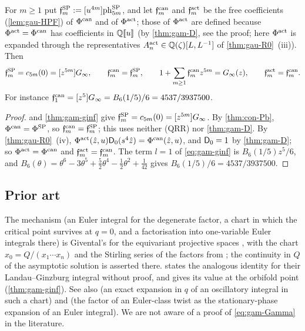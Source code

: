 \begin{cor}
\label{cor:gam-free}
For $m\geq 1$ put $\mathfrak{f}^{\mathrm{SP}}_m:=[u^{4m}]\mathrm{ph}^{\mathrm{SP}}_{5m}$, and let $\mathfrak{f}^{\mathrm{can}}_m$ and $\mathfrak{f}^{\mathrm{act}}_m$ be the free coefficients (\cref{lem:gau-HPF}) of $\Phi^{\mathrm{can}}$ and of $\Phi^{\mathrm{act}}$; those of $\Phi^{\mathrm{act}}$ are defined because $\Phi^{\mathrm{act}}=\Phi^{\mathrm{can}}$ has coefficients in $\mathbb{Q}[\![ u ]\!]$ (by \cref{thm:gam-D}, see the proof; here $\Phi^{\mathrm{act}}$ is expanded through the representatives $A^{\mathrm{act}}_n\in\mathbb{Q}(\zeta)[L,L^{-1}]$ of \cref{thm:gau-R0}~(iii)). Then
\[
\mathfrak{f}^{\mathrm{SP}}_m=c_{5m}(0)=[z^{5m}]G_{\infty},\qquad \mathfrak{f}^{\mathrm{can}}_m=\mathfrak{f}^{\mathrm{SP}}_m,\qquad 1+\sum_{m\geq 1}\mathfrak{f}^{\mathrm{can}}_mz^{5m}=G_{\infty}(z),\qquad \mathfrak{f}^{\mathrm{act}}_m=\mathfrak{f}^{\mathrm{can}}_m.
\]
For instance $\mathfrak{f}^{\mathrm{can}}_1=[z^5]G_{\infty}=B_6(1/5)/6=4537/3937500$.
\end{cor}

\begin{proof}
 and \cref{thm:gam-ginf} give $\mathfrak{f}^{\mathrm{SP}}_m=c_{5m}(0)=[z^{5m}]G_{\infty}$. By \cref{thm:con-Pb}, $\Phi^{\mathrm{can}}=\Phi^{\mathrm{SP}}$, so $\mathfrak{f}^{\mathrm{can}}_m=\mathfrak{f}^{\mathrm{SP}}_m$; this uses neither (QRR) nor \cref{thm:gam-D}. By \cref{thm:gau-R0}~(iv), $\Phi^{\mathrm{act}}(\hat{z},u)\mathsf{D}_0(s^4\hat{z})=\Phi^{\mathrm{can}}(\hat{z},u)$, and $\mathsf{D}_0=1$ by \cref{thm:gam-D}; so $\Phi^{\mathrm{act}}=\Phi^{\mathrm{can}}$ and $\mathfrak{f}^{\mathrm{act}}_m=\mathfrak{f}^{\mathrm{can}}_m$. The term $l=1$ of \eqref{eq:gam-ginf} is $B_6(1/5)z^5/6$, and $B_6(\theta)=\theta^6-3\theta^5+\tfrac52\theta^4-\tfrac12\theta^2+\tfrac1{42}$ gives $B_6(1/5)/6=4537/3937500$.
\end{proof}

\subsection{Prior art}
\label{sec:gam-rmk}

\begin{rmk}
\label{rmk:gam-prior}
The mechanism (an Euler integral for the degenerate factor, a chart in which the critical point survives at $q=0$, and a factorisation into one-variable Euler integrals there) is Givental's for the equivariant projective spaces \cite[\S10]{MR1901075}, with the chart $x_0=Q/(x_1\cdots x_n)$ and the Stirling series of the factors from \cite[10.4~Lemma]{MR1901075}; the continuity in $Q$ of the asymptotic solution is asserted there.  \cite[Remark~7.2]{GJR18} states the analogous identity for their Landau--Ginzburg integral without proof, and \cite[Lemma~7.7, (37)]{GJR18} gives its value at the orbifold point (\cref{thm:gam-ginf}). See also \cite[Lemma~4.20]{MR2553377} (an exact expansion in $q$ of an oscillatory integral in such a chart) and \cite[\S7, (11)]{MR2276766} (the factor of an Euler-class twist as the stationary-phase expansion of an Euler integral). We are not aware of a proof of \eqref{eq:gam-Gamma} in the literature.
\end{rmk}
